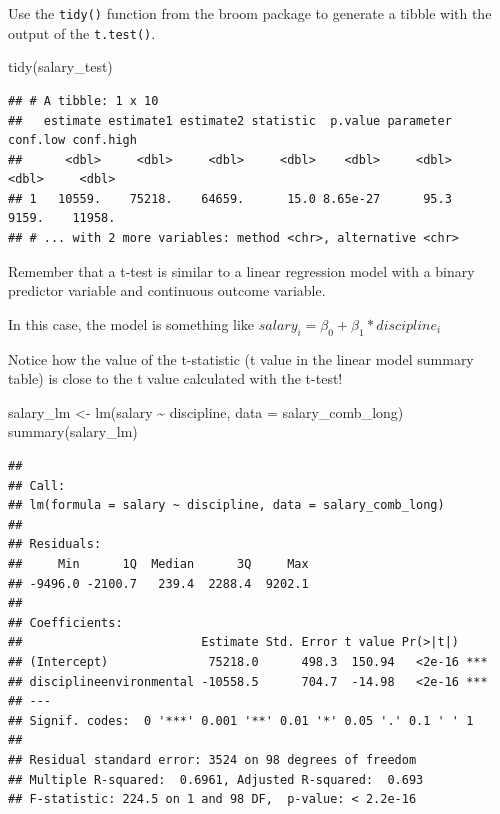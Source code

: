 \documentclass[
]{book}
\newenvironment{Shaded}{\begin{snugshade}}{\end{snugshade}}
\newcommand{\AttributeTok}[1]{\textcolor[rgb]{0.77,0.63,0.00}{#1}}
\newcommand{\FunctionTok}[1]{\textcolor[rgb]{0.00,0.00,0.00}{#1}}
\newcommand{\NormalTok}[1]{#1}
\newcommand{\OtherTok}[1]{\textcolor[rgb]{0.56,0.35,0.01}{#1}}
\newcommand{\SpecialCharTok}[1]{\textcolor[rgb]{0.00,0.00,0.00}{#1}}
\begin{document}
Use the \texttt{tidy()} function from the broom package to generate a tibble with the output of the \texttt{t.test()}.

\begin{Shaded}
\begin{Highlighting}[]
\FunctionTok{tidy}\NormalTok{(salary\_test)}
\end{Highlighting}
\end{Shaded}

\begin{verbatim}
## # A tibble: 1 x 10
##   estimate estimate1 estimate2 statistic  p.value parameter conf.low conf.high
##      <dbl>     <dbl>     <dbl>     <dbl>    <dbl>     <dbl>    <dbl>     <dbl>
## 1   10559.    75218.    64659.      15.0 8.65e-27      95.3    9159.    11958.
## # ... with 2 more variables: method <chr>, alternative <chr>
\end{verbatim}

Remember that a t-test is similar to a linear regression model with a binary predictor variable and continuous outcome variable.

In this case, the model is something like \(salary_i = \beta_0 + \beta_1 * discipline_i\)

Notice how the value of the t-statistic (t value in the linear model summary table) is close to the t value calculated with the t-test!

\begin{Shaded}
\begin{Highlighting}[]
\NormalTok{salary\_lm }\OtherTok{\textless{}{-}} \FunctionTok{lm}\NormalTok{(salary }\SpecialCharTok{\textasciitilde{}}\NormalTok{ discipline, }\AttributeTok{data =}\NormalTok{ salary\_comb\_long)}
\FunctionTok{summary}\NormalTok{(salary\_lm)}
\end{Highlighting}
\end{Shaded}

\begin{verbatim}
## 
## Call:
## lm(formula = salary ~ discipline, data = salary_comb_long)
## 
## Residuals:
##     Min      1Q  Median      3Q     Max 
## -9496.0 -2100.7   239.4  2288.4  9202.1 
## 
## Coefficients:
##                         Estimate Std. Error t value Pr(>|t|)    
## (Intercept)              75218.0      498.3  150.94   <2e-16 ***
## disciplineenvironmental -10558.5      704.7  -14.98   <2e-16 ***
## ---
## Signif. codes:  0 '***' 0.001 '**' 0.01 '*' 0.05 '.' 0.1 ' ' 1
## 
## Residual standard error: 3524 on 98 degrees of freedom
## Multiple R-squared:  0.6961, Adjusted R-squared:  0.693 
## F-statistic: 224.5 on 1 and 98 DF,  p-value: < 2.2e-16
\end{verbatim}
\end{document}
